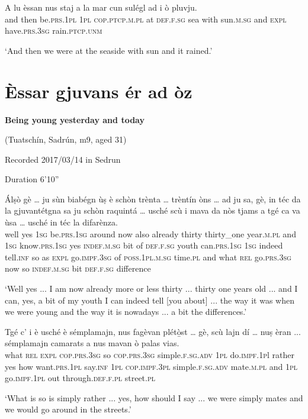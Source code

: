 \begin{linenumbers}
	\gll  A lu èssan nus staj a la mar cun sulégl ad i ò pluvju.   \\
	and then be.\textsc{prs.1pl} \textsc{1pl} \textsc{cop.ptcp.m.pl} at \textsc{def.f.sg} sea with sun.\textsc{m.sg} and \textsc{expl} have.\textsc{prs.3sg} rain.\textsc{ptcp.unm}\\
\end{linenumbers}
\medskip
\glt `And then we were at the seaside with sun and it rained.'
\medskip


\section{Èssar gjuvans ér ad òz}\label{sec:8.15}

\noindent
\textbf{Being young yesterday and today}

\noindent
(Tuatschín, Sadrún, m9, aged 31)

\noindent
Recorded 2017/03/14 in Sedrun

\noindent
Duration 6'10''

\bigskip

\begin{linenumbers}
	\gll Álṣò gè … ju sùn biabégn ùṣ è schòn trènta … trèntín òns … ad ju sa, gè, in téc da la gjuvantétgna sa ju schòn raquintá … usché scù i mava da nòs tjams a tgé ca va ùsa … usché in téc la difarènza.\\
	well yes {} \textsc{1sg} be.\textsc{prs.1sg} around now also already thirty {} thirty\_one year.\textsc{m.pl} {} and \textsc{1sg} know.\textsc{prs.1sg} yes \textsc{indef.m.sg} bit of \textsc{def.f.sg} youth can.\textsc{prs.1sg} \textsc{1sg} indeed tell.\textsc{inf} {} so as \textsc{expl} go.\textsc{impf.3sg} of \textsc{poss.1pl.m.sg} time.\textsc{pl} and what \textsc{rel} go.\textsc{prs.3sg} now {} so \textsc{indef.m.sg} bit \textsc{def.f.sg} difference\\
\end{linenumbers}
\medskip
\glt `Well yes ... I am now already more or less thirty ... thirty one years old ... and I can, yes, a bit of my youth I can indeed tell [you about] ... the way it was when we were young and the way it is nowadays ... a bit the differences.'
\medskip

\begin{linenumbers}
	\gll Tgé c’ i è usché è sémplamajn, nus fagèvan plétò̱st … gè, scù lajn dí … nuṣ èran ... sémplamajn camarats a nus mavan ò palas vias.    \\
	what \textsc{rel} \textsc{expl} \textsc{cop.prs.3sg} so \textsc{cop.prs.3sg} simple.\textsc{f.sg.adv} \textsc{1pl} do.\textsc{impf.1p}l rather {} yes how want.\textsc{prs.1pl} say.\textsc{inf} {} \textsc{1pl} \textsc{cop.impf.3pl} {} simple.\textsc{f.sg.adv} mate.\textsc{m.pl} and \textsc{1pl} go.\textsc{impf.1pl} out through.\textsc{def.f.pl} street.\textsc{pl}\\
\end{linenumbers}
\medskip
\glt `What is so is simply rather ... yes, how should I say ... we were simply mates and we would go around in the streets.'
\medskip

